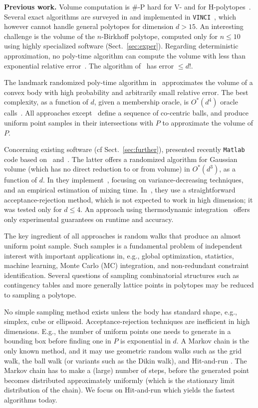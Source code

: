 \documentclass[11pt,a4paper]{article}
\begin{document}
\textbf{Previous work.} 
Volume computation is $\#$-P hard for V- and for H-polytopes~\cite{DyerFr88}.
Several exact algorithms are surveyed in
\cite{FukVolume00} and implemented in {\tt VINCI}~\cite{vinci},
which however cannot handle general polytopes for dimension $d>15$.
An interesting challenge is the volume of the $n$-Birkhoff polytope,
computed only for $n\le 10$ using highly specialized software
(Sect.~\ref{sec:exper}).
Regarding deterministic approximation,
no poly-time algorithm can compute the volume with less than
exponential relative error~\cite{Elekes86}.
The algorithm of~\cite{Henk93} has error $\le d!$. 

The landmark randomized poly-time algorithm in~\cite{DyerFrKa91} 
approximates the volume of a convex body with high probability 
and arbitrarily small relative error.
The best complexity, as a function of $d$, given a membership oracle, is $O^*(d^4)$ oracle calls~\cite{LovaszVemp06vol}. 
All approaches except~\cite{LovaszVemp06vol}
define a sequence of co-centric balls,
and produce uniform point samples in their intersections with $P$
to approximate the volume of $P$.

Concerning existing software (cf Sect.~\ref{sec:further}),
\cite{CousinsV13_matlab} presented recently {\tt Matlab} code 
based on~\cite{LovaszVemp06vol} and~\cite{CousinsV13}. The latter offers a
randomized algorithm for Gaussian volume
(which has no direct reduction to or from volume)
in $O^*(d^3)$, as a function of $d$.
In \cite{LovaszD12} they implement~\cite{LovaszVemp06vol}, focusing on
variance-decreasing techniques, and
an empirical estimation of mixing time.
In~\cite{LZZ07DirectMC}, they use a straightforward acceptance-rejection
method, which is not expected to work in high dimension;
it was tested only for $d\le 4$.
An approach using thermodynamic integration~\cite{Jaekel11} offers only
experimental guarantees on runtime and accuracy.

The key ingredient of all approaches is random walks that produce an
almost uniform point sample.  Such samples is a fundamental problem
of independent interest with important applications in, e.g.,
global optimization, statistics, machine learning,
Monte Carlo (MC) integration, and non-redundant constraint identification.
Several questions of sampling combinatorial structures such as
contingency tables 
and more generally lattice points in polytopes 
may be reduced to sampling a polytope.

No simple sampling method exists unless the body
has standard shape, e.g., simplex, cube or ellipsoid.
Acceptance-rejection techniques are inefficient in high dimensions.
E.g., the number of uniform points one needs to generate in a 
bounding box before finding one in $P$ is exponential in $d$.
A Markov chain is the only known method, and it
may use geometric random walks such as the grid walk,
the ball walk (or variants such as the Dikin walk),
and Hit-and-run \cite{Simonovits03}. 
The Markov chain has to make a (large) number of steps, before the
generated point becomes distributed approximately uniformly
(which is the stationary limit distribution of the chain).
We focus on Hit-and-run which yields the fastest algorithms today.  
\end{document}
